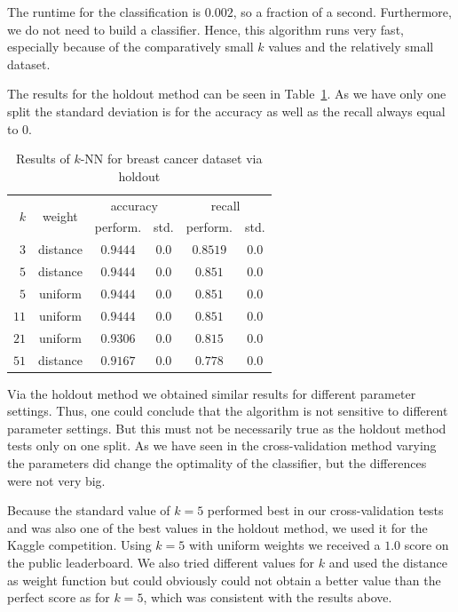 \documentclass[a4paper,11pt]{article}
\begin{document}
        The runtime for the classification is $0.002$, so a fraction of a second. Furthermore, we do not need to build a classifier. Hence, this algorithm runs very fast, especially because of the comparatively small $k$ values and the relatively small dataset.
        
        The results for the holdout method can be seen in Table~\ref{tbl:kNN_breast-cancer-holdout}. As we have only one split the standard deviation is for the accuracy as well as the recall always equal to $0$.
        
        \begin{table}[h]
        \centering
            \begin{tabular}[h]{r|c|c|c|c|c|}
               \multirow{2}{*}{$k$} & \multirow{2}{*}{weight} & \multicolumn{2}{|c|}{accuracy} & \multicolumn{2}{|c|}{recall} \\
                & & perform. & std. & perform. & std. \\
                \hline
                $3$ & distance & $0.9444$ & $0.0$ & $0.8519$ & $0.0$ \\
                \hline
                $5$ & distance & $0.9444$ & $0.0$ & $0.851$ & $0.0$ \\
                \hline
                $5$ & uniform & $0.9444$ & $0.0$ & $0.851$ & $0.0$ \\
                \hline
                $11$ & uniform & $0.9444$ & $0.0$ & $0.851$ & $0.0$ \\
                \hline
                $21$ & uniform & $0.9306$ & $0.0$ & $0.815$ & $0.0$ \\
                \hline
                $51$ & distance & $0.9167$ & $0.0$ & $0.778$ & $0.0$
            \end{tabular}
            \caption{Results of $k$-NN for breast cancer dataset via holdout}
            \label{tbl:kNN_breast-cancer-holdout}
        \end{table} 
        
        Via the holdout method we obtained similar results for different parameter settings. Thus, one could conclude that the algorithm is not sensitive to different parameter settings. But this must not be necessarily true as the holdout method tests only on one split. As we have seen in the cross-validation method varying the parameters did change the optimality of the classifier, but the differences were not very big. 
        
        Because the standard value of $k=5$ performed best in our cross-validation tests and was also one of the best values in the holdout method, we used it for the Kaggle competition. Using $k=5$ with uniform weights we received a $1.0$ score on the public leaderboard. We also tried different values for $k$ and used the distance as weight function but could obviously could not obtain a better value than the perfect score as for $k=5$, which was consistent with the results above.
    
\end{document}
